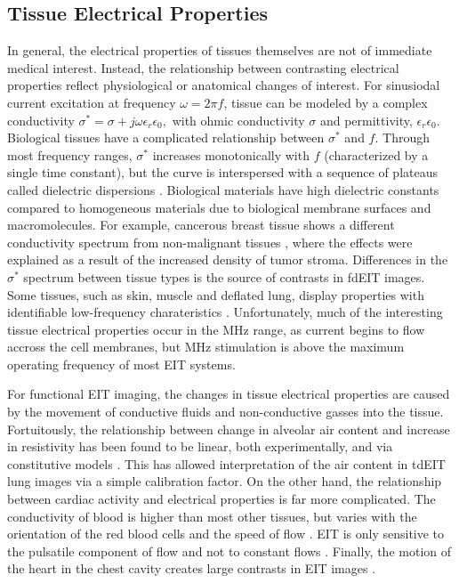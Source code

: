 \documentclass[10pt,journal]{IEEEtran}\def\TBLWIDA{15mm}\def\TBLWIDB{60mm}
\begin{document}
\subsection{Tissue Electrical Properties}

In general, the electrical properties of tissues themselves are not 
of immediate medical interest. Instead, the relationship between
contrasting electrical properties reflect physiological or anatomical
changes of interest. For sinusiodal current excitation at 
frequency $\omega=2\pi f$, tissue can be modeled by a
complex conductivity
$
\sigma^* = \sigma + j\omega\epsilon_r\epsilon_0,
$
with ohmic conductivity $\sigma$ and 
permittivity, $\epsilon_r\epsilon_0$.
Biological tissues have a complicated relationship between
$\sigma^*$ and $f$. Through most frequency ranges, $\sigma^*$
increases monotonically with $f$ (characterized
by a single time constant), but the curve is
 interspersed with a sequence of plateaus
called dielectric dispersions \cite{Gabriel1996Dielectric}. Biological materials
have high dielectric constants compared to homogeneous
materials due to biological membrane surfaces and macromolecules.
For example, cancerous breast tissue
shows a different conductivity spectrum
from non-malignant tissues \cite{Jossinet1998Breast},
where the effects were explained
as a result of the increased density of tumor stroma.
Differences in the $\sigma^*$ spectrum between
tissue types is the source of contrasts in fdEIT images.
Some tissues,
such as skin, muscle and deflated lung, display properties
with identifiable low-frequency charateristics 
\cite{Gabriel2009Frequencies}. Unfortunately, much of 
the interesting tissue electrical properties
occur in the MHz range, as current begins to flow accross the
cell membranes, but MHz stimulation is above the maximum operating frequency
of most EIT systems.

For functional EIT imaging, the changes in tissue
electrical properties are caused by the movement of
conductive fluids and non-conductive gasses into
the tissue. Fortuitously, the relationship between
change in alveolar air content and increase in 
resistivity has been found to be linear, both
experimentally,
 and via constitutive models \cite{Roth2015Correlation}.
This has allowed interpretation of the air 
content in  tdEIT lung images via a simple calibration factor.
On the other hand, the relationship between 
cardiac activity and electrical properties is far
more complicated. The conductivity of blood is 
higher than most other tissues, but varies with
the orientation of the red blood cells and the
speed of flow \cite{Hoetink2004Flow}.
EIT is only sensitive to the
pulsatile component of flow 
and not to constant flows \cite{Frerichs2017Chest}.
Finally, the motion of the heart in the chest cavity
creates large contrasts in EIT images \cite{Proenca2015Motion}.
\end{document}
